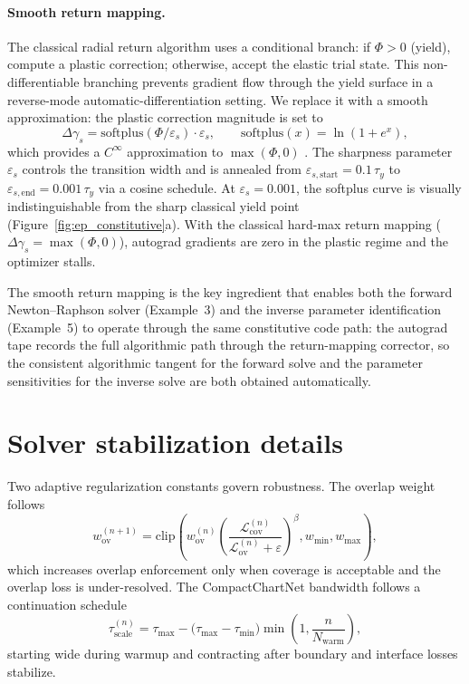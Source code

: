 \documentclass[sort&compress]{svjour3} %
\begin{document}
\paragraph{Smooth return mapping.}
The classical radial return algorithm \citep{simo_computational_1998} uses a conditional branch: if $\Phi > 0$ (yield), compute a plastic correction; otherwise, accept the elastic trial state. This non-differentiable branching prevents gradient flow through the yield surface in a reverse-mode automatic-differentiation setting. We replace it with a smooth approximation: the plastic correction magnitude is set to
\begin{equation}
\Delta\gamma_s = \mathrm{softplus}(\Phi/\varepsilon_s)\cdot\varepsilon_s,
\qquad
\mathrm{softplus}(x) = \ln(1+e^x),
\label{eq:smooth_return}
\end{equation}
which provides a $C^\infty$ approximation to $\max(\Phi,0)$ \citep{hu_difftaichi_2020,bark_differentiable_2025}. The sharpness parameter $\varepsilon_s$ controls the transition width and is annealed from $\varepsilon_{s,\mathrm{start}}=0.1\,\tau_y$ to $\varepsilon_{s,\mathrm{end}}=0.001\,\tau_y$ via a cosine schedule. At $\varepsilon_s=0.001$, the softplus curve is visually indistinguishable from the sharp classical yield point (Figure~\ref{fig:ep_constitutive}a). With the classical hard-max return mapping ($\Delta\gamma_s = \max(\Phi,0)$), autograd gradients are zero in the plastic regime and the optimizer stalls.

The smooth return mapping is the key ingredient that enables both the forward Newton--Raphson solver (Example~3) and the inverse parameter identification (Example~5) to operate through the same constitutive code path: the autograd tape records the full algorithmic path through the return-mapping corrector, so the consistent algorithmic tangent for the forward solve and the parameter sensitivities for the inverse solve are both obtained automatically.

\section{Solver stabilization details}
\label{sec:appendix_stabilization}

Two adaptive regularization constants govern robustness. The overlap weight follows
\begin{equation}
w_{\mathrm{ov}}^{(n+1)}=
\mathrm{clip}\!\left(
w_{\mathrm{ov}}^{(n)}
\left(\frac{\mathcal{L}_{\mathrm{cov}}^{(n)}}{\mathcal{L}_{\mathrm{ov}}^{(n)}+\varepsilon}\right)^{\beta},
w_{\min},w_{\max}
\right),
\label{eq:adaptive_overlap_weight}
\end{equation}
which increases overlap enforcement only when coverage is acceptable and the overlap loss is under-resolved. The CompactChartNet bandwidth follows a continuation schedule
\begin{equation}
\tau_{\mathrm{scale}}^{(n)}
=
\tau_{\max}-\big(\tau_{\max}-\tau_{\min}\big)
\min\!\left(1,\frac{n}{N_{\mathrm{warm}}}\right),
\label{eq:adaptive_tau_schedule}
\end{equation}
starting wide during warmup and contracting after boundary and interface losses stabilize.
\end{document}
